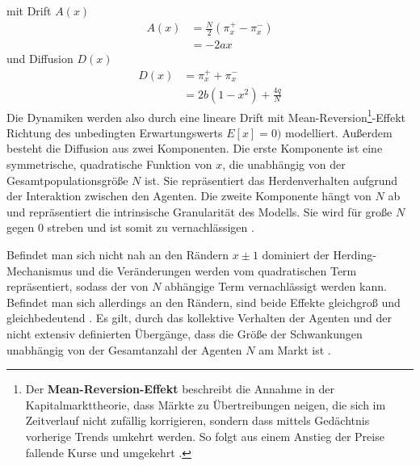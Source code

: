\documentclass[ngerman]{ttlab-qualify}
\begin{document}
mit Drift $A(x)$
\begin{align}
\label{eq:AL-drift}
A(x) &= \frac{N}{2}(\pi_x^+-\pi_x^-) \nonumber \\
&= -2ax
\end{align}
und Diffusion $D(x)$
\begin{align}
\label{eq:AL-diff}
D(x)&= \pi_x^++\pi_x^- \nonumber \\
&= 2b(1-x^2)+\frac{4q}{N}
\end{align}
Die Dynamiken werden also durch eine lineare Drift mit Mean-Reversion\footnote{Der \textbf{Mean-Reversion-Effekt} beschreibt die Annahme in der Kapitalmarkttheorie, dass Märkte zu Übertreibungen neigen, die sich im Zeitverlauf nicht zufällig korrigieren, sondern dass mittels Gedächtnis vorherige Trends umkehrt werden. So folgt aus einem Anstieg der Preise fallende Kurse und umgekehrt \parencite{MeanReversion}.}-Effekt Richtung des unbedingten Erwartungswerts $E[x]=0)$ modelliert.
Außerdem besteht die Diffusion aus zwei Komponenten. 
Die erste Komponente ist eine symmetrische, quadratische Funktion von $x$, die unabhängig von der Gesamtpopulationsgröße $N$ ist. Sie repräsentiert das Herdenverhalten aufgrund der Interaktion zwischen den Agenten. 
Die zweite Komponente hängt von $N$ ab und repräsentiert die intrinsische Granularität des Modells. Sie wird für große $N$ gegen 0 streben und ist somit zu vernachlässigen \parencite{AL:2008}.

Befindet man sich nicht nah an den Rändern $x\pm 1$ dominiert der Herding-Mechanismus und die Veränderungen werden vom quadratischen Term repräsentiert, sodass der von $N$ abhängige Term vernachlässigt werden kann. 
Befindet man sich allerdings an den Rändern, sind beide Effekte gleichgroß und gleichbedeutend \parencite{AL:2008}. 
Es gilt, durch das kollektive Verhalten der Agenten und der nicht extensiv definierten Übergänge, dass die Größe der Schwankungen unabhängig von der Gesamtanzahl der Agenten $N$ am Markt ist \parencite{AL:2008}.\\
\end{document}
